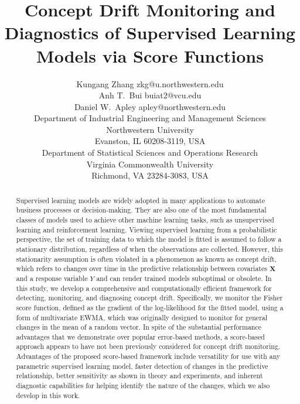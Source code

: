 \documentclass[twoside,11pt]{article}
\begin{document}
\title{Concept Drift Monitoring and Diagnostics of Supervised Learning Models via Score Functions}

\author{\name Kungang Zhang \email zkg@u.northwestern.edu \\
	\name Anh T.\ Bui \email buiat2@vcu.edu \\
	\name Daniel W.\ Apley \email apley@northwestern.edu \\
       \addr Department of Industrial Engineering and Management Sciences\\
       Northwestern University\\
       Evanston, IL 60208-3119, USA\\
       Department of Statistical Sciences and Operations Research\\ 
       Virginia Commonwealth University\\
       Richmond, VA 23284-3083, USA}

\maketitle

\begin{abstract}%
Supervised learning models are widely adopted in many applications to automate business processes or decision-making. They are also one of the most fundamental classes of models used to achieve other machine learning tasks, such as unsupervised learning and reinforcement learning. Viewing supervised learning from a probabilistic perspective, the set of training data to which the model is fitted is assumed to follow a stationary distribution, regardless of when the observations are collected. However, this stationarity assumption is often violated in a phenomenon as known as concept drift, which refers to changes over time in the predictive relationship between covariates $\bm{X}$ and a response variable $Y$ and can render trained models suboptimal or obsolete. In this study, we develop a comprehensive and computationally efficient framework for detecting, monitoring, and diagnosing concept drift. Specifically, we monitor the Fisher score function, defined as the gradient of the log-likelihood for the fitted model, using a form of multivariate EWMA, which was originally designed to monitor for general changes in the mean of a random vector. In spite of the substantial performance advantages that we demonstrate over popular error-based methods, a score-based approach appears to have not been previously considered for concept drift monitoring. Advantages of the proposed score-based framework include versatility for use with any parametric supervised learning model, faster detection of changes in the predictive relationship, better sensitivity as shown in theory and experiments, and inherent diagnostic capabilities for helping identify the nature of the changes, which we also develop in this work.
\end{abstract}
\end{document}
